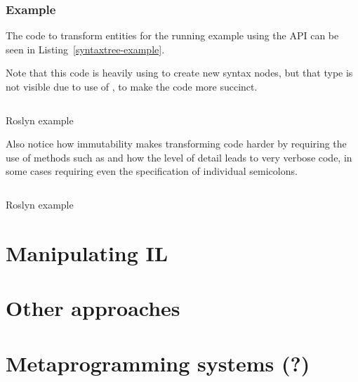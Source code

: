 \subsubsection{Example}

The code to transform entities for the running example using the  \ac{API} can be seen in Listing~\ref{syntaxtree-example}.

Note that this code is heavily using  to create new syntax nodes, but that type is not visible due to use of , to make the code more succinct.

\begin{listing}
\inputminted[firstline=15,lastline=50]{csharp}{samples/Roslyn/Program.cs}
\caption{Roslyn  example}
\label{syntaxtree-example}
\end{listing}

Also notice how immutability makes transforming code harder by requiring the use of methods such as  and how the level of detail leads to very verbose code, in some cases requiring even the specification of individual semicolons.

\medskip


\begin{listing}
\inputminted[firstline=17,lastline=73]{csharp}{samples/Roslyn.SyntaxGenerator/Program.cs}
\caption{Roslyn  example}
\label{syntaxgenerator-example}
\end{listing}



\section{Manipulating \acs{IL}}


\section{Other approaches}


\section{Metaprogramming systems (?)}
\label{metaprogramming}

